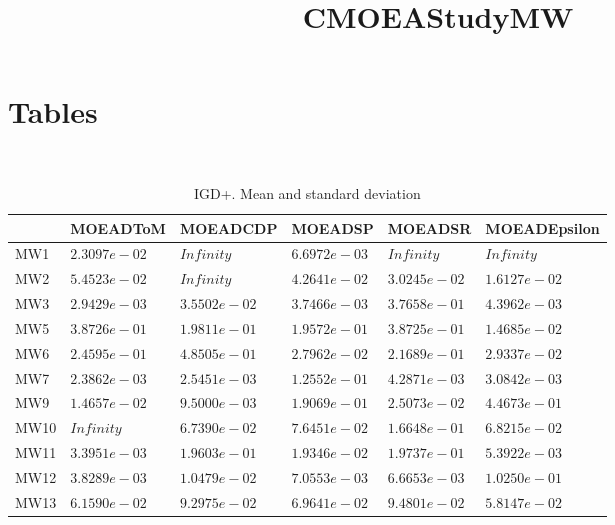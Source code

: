 \documentclass[a3paper]{article}
\title{CMOEAStudyMW}
\author{}
\begin{document}
\maketitle
\section{Tables}
\
\begin{table*}
\caption{IGD+. Mean and standard deviation}
\label{table:mean.IGD+}
\centering
\begin{tiny}
\begin{tabular}{llllll}
\hline & MOEADToM & MOEADCDP & MOEADSP & MOEADSR &  MOEADEpsilon\\
\hline
MW1 & \cellcolor{gray25}$2.3097e-02$ & $Infinity$ & \cellcolor{gray95}$6.6972e-03$ & $Infinity$ & $Infinity$ \\
MW2 & $5.4523e-02$ & $Infinity$ & $4.2641e-02$ & \cellcolor{gray25}$3.0245e-02$ & \cellcolor{gray95}$1.6127e-02$ \\
MW3 & \cellcolor{gray95}$2.9429e-03$ & $3.5502e-02$ & \cellcolor{gray25}$3.7466e-03$ & $3.7658e-01$ & $4.3962e-03$ \\
MW5 & $3.8726e-01$ & $1.9811e-01$ & \cellcolor{gray25}$1.9572e-01$ & $3.8725e-01$ & \cellcolor{gray95}$1.4685e-02$ \\
MW6 & $2.4595e-01$ & $4.8505e-01$ & \cellcolor{gray95}$2.7962e-02$ & $2.1689e-01$ & \cellcolor{gray25}$2.9337e-02$ \\
MW7 & \cellcolor{gray95}$2.3862e-03$ & \cellcolor{gray25}$2.5451e-03$ & $1.2552e-01$ & $4.2871e-03$ & $3.0842e-03$ \\
MW9 & \cellcolor{gray25}$1.4657e-02$ & \cellcolor{gray95}$9.5000e-03$ & $1.9069e-01$ & $2.5073e-02$ & $4.4673e-01$ \\
MW10 & $Infinity$ & \cellcolor{gray95}$6.7390e-02$ & $7.6451e-02$ & $1.6648e-01$ & \cellcolor{gray25}$6.8215e-02$ \\
MW11 & \cellcolor{gray95}$3.3951e-03$ & $1.9603e-01$ & $1.9346e-02$ & $1.9737e-01$ & \cellcolor{gray25}$5.3922e-03$ \\
MW12 & \cellcolor{gray95}$3.8289e-03$ & $1.0479e-02$ & $7.0553e-03$ & \cellcolor{gray25}$6.6653e-03$ & $1.0250e-01$ \\
MW13 & \cellcolor{gray25}$6.1590e-02$ & $9.2975e-02$ & $6.9641e-02$ & $9.4801e-02$ & \cellcolor{gray95}$5.8147e-02$ \\
\hline
\end{tabular}
\end{tiny}
\end{table*}
\end{document}
